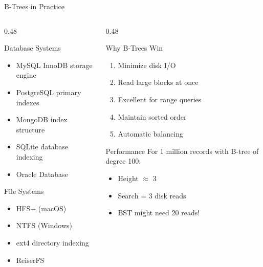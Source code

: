 \documentclass[aspectratio=169,xcolor=dvipsnames]{beamer}
\begin{document}
\begin{frame}{B-Trees in Practice}
  \begin{columns}
    \begin{column}{0.48\textwidth}
      \begin{block}{Database Systems}
        \begin{itemize}
          \item MySQL InnoDB storage engine
          \item PostgreSQL primary indexes
          \item MongoDB index structure
          \item SQLite database indexing
          \item Oracle Database
        \end{itemize}
      \end{block}

      \begin{block}{File Systems}
        \begin{itemize}
          \item HFS+ (macOS)
          \item NTFS (Windows)
          \item ext4 directory indexing
          \item ReiserFS
        \end{itemize}
      \end{block}
    \end{column}
    \begin{column}{0.48\textwidth}
      \begin{block}{Why B-Trees Win}
        \begin{enumerate}
          \item Minimize disk I/O
          \item Read large blocks at once
          \item Excellent for range queries
          \item Maintain sorted order
          \item Automatic balancing
        \end{enumerate}
      \end{block}

      \begin{alertblock}{Performance}
        For 1 million records with B-tree of degree 100:
        \begin{itemize}
          \item Height $\approx$ 3
          \item Search = 3 disk reads
          \item BST might need 20 reads!
        \end{itemize}
      \end{alertblock}
    \end{column}
  \end{columns}
\end{frame}
\end{document}
